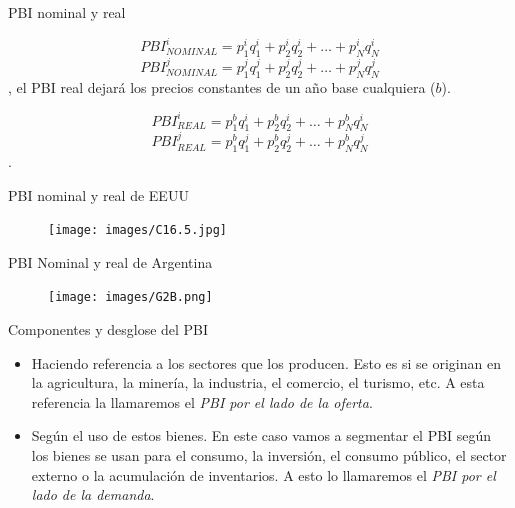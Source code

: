 \documentclass{beamer}
\begin{document}
\begin{frame}{PBI nominal y real}
   
$$PBI_{NOMINAL}^{i} = p_1^{i}q_1^{i} + p_2^{i}q_2^{i} + … + p_N^{i}q_N^{i}$$
$$PBI_{NOMINAL}^{j} = p_1^{j}q_1^{j} + p_2^{j}q_2^{j} + … + p_N^{j}q_N^{j}$$,
el PBI real dejará los precios constantes de un año base cualquiera ($b$).

$$PBI_{REAL}^{i} = p_1^{b}q_1^{i} + p_2^{b}q_2^{i} + … + p_N^{b}q_N^{i}$$
$$PBI_{REAL}^{j} = p_1^{b}q_1^{j} + p_2^{b}q_2^{j} + … + p_N^{b}q_N^{j}$$.
\end{frame}


\begin{frame}{PBI nominal y real de EEUU}
    \begin{figure} [H]   \texttt{[image: images/C16.5.jpg]}
\label{fig:25.5}
\end{figure}
\end{frame}
 

\begin{frame}{PBI Nominal y real de Argentina}
    \begin{figure} [H]   \texttt{[image: images/G2B.png]}

\label{fig:G2}
\end{figure}
\end{frame}


\begin{frame}{Componentes y desglose del PBI}
    \begin{itemize}
    \item Haciendo referencia a los sectores que los producen. Esto es si se originan en la agricultura, la minería, la industria, el comercio, el turismo, etc. A esta referencia la llamaremos el \textit{PBI por el lado de la oferta}. 
    \item Según el uso de estos bienes. En este caso vamos a segmentar el PBI según los bienes se usan para el consumo, la  inversión, el consumo público, el sector externo o la acumulación de inventarios. A esto lo llamaremos el \textit{PBI por el lado de la demanda}. 
\end{itemize}
\end{frame}
\end{document}
